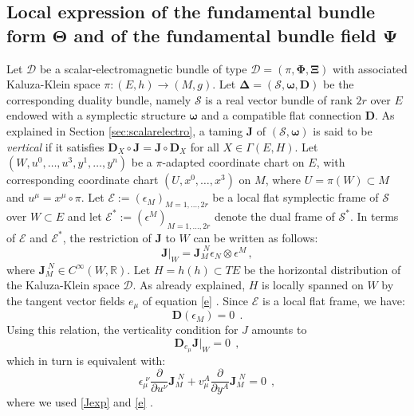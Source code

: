 \documentclass[10pt, cmp, numbook, final, a4paper]{svjour}
\newcommand*{\SavedEqref}{}
\let\SavedEqref\eqref
\renewcommand*{\eqref}[1]{%
  \begingroup
    \hypersetup{
      linkcolor=blue,
      linkbordercolor=blue,
    }%
    \SavedEqref{#1}%
  \endgroup
}
\newcommand{\bDelta}{\boldsymbol{\Delta}}
\def\bD{\mathbb{D}}
\def\bcD{\boldsymbol{\mathcal{D}}}
\def\bJ{\mathbf{J}}
\def\bomega{\boldsymbol{\omega}}
\def\bJ{\mathbf{J}}
\def\bTheta{\mathbf{\Theta}}
\def\bPsi{\mathbf{\Psi}}
\newcommand{\ben}{\begin{equation}}
\newcommand{\een}{\end{equation}}
\def\cE{\check{E}}
\def\bXi{{\boldsymbol{\Xi}}}
\def\cE{\mathcal{E}}
\def\bPhi{\mathbf{\Phi}}
\def\bD{\mathbf{D}}
\def\bomega{\boldsymbol{\omega}}
\def\bcS{\boldsymbol{\mathcal{S}}}
\def\bD{\mathbf{D}}
\begin{document}
\subsection{Local expression of the fundamental bundle form $\bTheta$ and of the fundamental bundle field $\bPsi$}

Let $\bcD$ be a scalar-electromagnetic bundle of type $\bcD =
(\pi,\bPhi,\bXi)$ with associated Kaluza-Klein space $\pi\colon
(E,h)\to (M,g)$. Let $\bDelta = (\bcS,\bomega,\bD)$ be the
corresponding duality bundle, namely $\bcS$ is a real vector bundle of
rank $2r$ over $E$ endowed with a symplectic structure $\bomega$ and a
compatible flat connection $\bD$. As explained in Section
\ref{sec:scalarelectro}, a taming $\bJ$ of $(\bcS,\bomega)$ is said to
be \emph{vertical} if it satisfies $\bD_{X}\circ \bJ = \bJ\circ
\bD_{X}$ for all $X\in\Gamma(E,H)$.  Let $(W,u^0,\ldots, u^3, y^1,
\ldots, y^n)$ be a $\pi$-adapted coordinate chart on $E$, with
corresponding coordinate chart $(U,x^0,\ldots, x^3)$ on $M$, where
$U=\pi(W)\subset M$ and $u^\mu=x^\mu\circ \pi$. Let $\cE := (
\epsilon_{M})_{M=1,\ldots, 2r}$ be a local flat symplectic frame of
$\bcS$ over $W\subset E$ and let $\cE^{\ast}
:=(\epsilon^{M})_{M=1,\ldots, 2r}$ denote the dual frame of
$\bcS^\ast$. In terms of $\cE$ and $\cE^{\ast}$, the restriction of
$\bJ$ to $W$ can be written as follows:
\ben
\label{Jexp}
\bJ|_{W} = \bJ_{M}^{\,\, N} \epsilon_{N}\otimes \epsilon^{M}\, ,
\een
where $\bJ_{M}^{\,\, N}\in C^{\infty}(W,\mathbb{R})$. Let
$H=h(h)\subset TE$ be the horizontal distribution of the Kaluza-Klein
space $\bcD$.  As already explained, $H$ is locally spanned on $W$ by
the tangent vector fields $e_\mu$ of equation \eqref{e}.  Since $\cE$
is a local flat frame, we have:
\begin{equation*}
\bD(\epsilon_{M}) = 0~~.
\end{equation*}
Using this relation, the verticality condition for $J$ amounts to
\begin{equation*}
\bD_{e_{\mu}}\bJ|_W = 0~~,
\end{equation*}
which in turn is equivalent with:
\ben
\label{Jvertlocal}
\epsilon_{\mu}^{\,\,\nu}\frac{\partial}{\partial u^{\nu}} \bJ_{M}^{\,\,N} + v_{\mu}^{A}\frac{\partial}{\partial y^{A}} \bJ_{M}^{\,\,N} = 0~~,
\een
where we used \eqref{Jexp} and \eqref{e}. 
\end{document}

